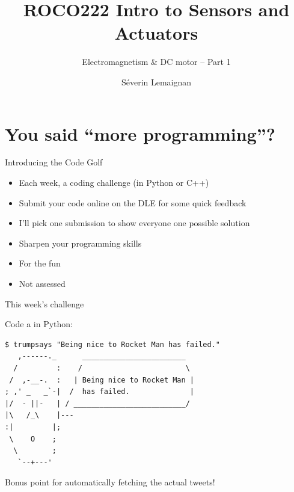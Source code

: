 \documentclass[compress]{beamer}
\title{ROCO222 \newline Intro to Sensors and Actuators}
\subtitle{Electromagnetism \& DC motor -- Part 1}
\date{}
\author{Séverin Lemaignan}
\institute{Centre for Robotics and Neural Systems\\{\bf Plymouth University}}
\makeatletter
\let\beamer@writeslidentry@miniframeson=\beamer@writeslidentry
\def\beamer@writeslidentry@miniframesoff{%
  \expandafter\beamer@ifempty\expandafter{\beamer@framestartpage}{}%
  {%
    \clearpage\beamer@notesactions%
  }
}
\newcommand*{\miniframeson}{\let\beamer@writeslidentry=\beamer@writeslidentry@miniframeson}
\newcommand*{\miniframesoff}{\let\beamer@writeslidentry=\beamer@writeslidentry@miniframesoff}
\makeatother
\begin{document}



\maketitle

\miniframesoff
\section[]{You said ``more programming''?}

\begin{frame}{Introducing the Code Golf}

    \begin{itemize}
        \item Each week, a coding challenge (in Python or C++)
        \item Submit your code online on the DLE for some quick feedback
        \item I'll pick one submission to show everyone one possible solution
    \end{itemize}

    \begin{itemize}
        \item Sharpen your programming skills
        \item For the fun
        \item Not assessed
    \end{itemize}

\end{frame}

\begin{frame}[fragile]{This week's challenge}

Code a  in Python:

\begin{verbatim}
$ trumpsays "Being nice to Rocket Man has failed."
   ,------._      ________________________
  /         :    /                        \
 /  ,-__-.  :   | Being nice to Rocket Man |
; ,' _   _`-|  /  has failed.              |
|/  - ||-   | / __________________________/
|\   /_\    |---
:|         |;
 \    O    ;
  \        ;
   `--+---'
\end{verbatim}

Bonus point for automatically fetching the actual tweets!

\end{frame}
\miniframeson
\end{document}
